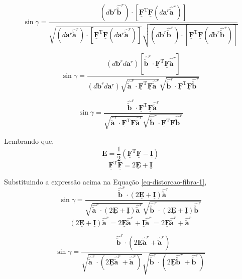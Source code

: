 \[\sin\gamma=\frac{(d\mathbf{b}^r\hat{\utilde{\mathbf{b}}}^r)\cdot[\underline{\mathbf{F}}^{\text{T}}\underline{\mathbf{F}}(d\mathbf{a}^r\hat{\utilde{\mathbf{a}}}^r)]}{\sqrt{(d\mathbf{a}^r\hat{\utilde{\mathbf{a}}}^r)\cdot[\underline{\mathbf{F}}^{\text{T}}\underline{\mathbf{F}}(d\mathbf{a}^r\hat{\utilde{\mathbf{a}}}^r)]}\sqrt{(d\mathbf{b}^r\hat{\utilde{\mathbf{b}}}^r)\cdot[\underline{\mathbf{F}}^{\text{T}}\underline{\mathbf{F}}(d\mathbf{b}^r\hat{\utilde{\mathbf{b}}}^r)]}}\]

\[\sin\gamma=\frac{(d\mathbf{b}^rd\mathbf{a}^r)[\hat{\utilde{\mathbf{b}}}^r\cdot\underline{\mathbf{F}}^{\text{T}}\underline{\mathbf{F}}\hat{\utilde{\mathbf{a}}}^r]}{(d\mathbf{b}^rd\mathbf{a}^r)\sqrt{\hat{\utilde{\mathbf{a}}}^r\cdot\underline{\mathbf{F}}^{\text{T}}\underline{\mathbf{F}}\hat{\utilde{\mathbf{a}}}^r}\sqrt{\hat{\utilde{\mathbf{b}}}^r\cdot\underline{\mathbf{F}}^{\text{T}}\underline{\mathbf{F}}\hat{\utilde{\mathbf{b}}}^r}}\]

\begin{equation}\label{eq-distorcao-fibra-1}
    \sin\gamma=\frac{\hat{\utilde{\mathbf{b}}}^r\cdot\underline{\mathbf{F}}^{\text{T}}\underline{\mathbf{F}}\hat{\utilde{\mathbf{a}}}^r}{\sqrt{\hat{\utilde{\mathbf{a}}}^r\cdot\underline{\mathbf{F}}^{\text{T}}\underline{\mathbf{F}}\hat{\utilde{\mathbf{a}}}^r}\sqrt{\hat{\utilde{\mathbf{b}}}^r\cdot\underline{\mathbf{F}}^{\text{T}}\underline{\mathbf{F}}\hat{\utilde{\mathbf{b}}}^r}}
\end{equation}		

Lembrando que,
\[\underline{\mathbf{E}}=\frac{1}{2}(\underline{\mathbf{F}}^{\text{T}}\underline{\mathbf{F}}-\underline{\mathbf{I}})\]
\[\underline{\mathbf{F}}^{\text{T}}\underline{\mathbf{F}}=2\underline{\mathbf{E}}+\underline{\mathbf{I}}\]

Substituindo a expressão acima na Equação \eqref{eq-distorcao-fibra-1},
\[\sin\gamma=\frac{\hat{\utilde{\mathbf{b}}}^r\cdot(2\underline{\mathbf{E}}+\underline{\mathbf{I}})\hat{\utilde{\mathbf{a}}}^r}{\sqrt{\hat{\utilde{\mathbf{a}}}^r\cdot(2\underline{\mathbf{E}}+\underline{\mathbf{I}})\hat{\utilde{\mathbf{a}}}^r}\sqrt{\hat{\utilde{\mathbf{b}}}^r\cdot(2\underline{\mathbf{E}}+\underline{\mathbf{I}})\hat{\utilde{\mathbf{b}}}^r}}\]
\[(2\underline{\mathbf{E}}+\underline{\mathbf{I}})\hat{\utilde{\mathbf{a}}}^r=2\underline{\mathbf{E}}\hat{\utilde{\mathbf{a}}}^r+\underline{\mathbf{I}}\hat{\utilde{\mathbf{a}}}^r=2\underline{\mathbf{E}}\hat{\utilde{\mathbf{a}}}^r+\hat{\utilde{\mathbf{a}}}^r\]

\[\sin\gamma=\frac{\hat{\utilde{\mathbf{b}}}^r\cdot(2\underline{\mathbf{E}}\hat{\utilde{\mathbf{a}}}^r+\hat{\utilde{\mathbf{a}}}^r)}{\sqrt{\hat{\utilde{\mathbf{a}}}^r\cdot(2\underline{\mathbf{E}}\hat{\utilde{\mathbf{a}}}^r+\hat{\utilde{\mathbf{a}}}^r)}\sqrt{\hat{\utilde{\mathbf{b}}}^r\cdot(2\underline{\mathbf{E}}\hat{\utilde{\mathbf{b}}}^r+\hat{\utilde{\mathbf{b}}}^r)}}\]

